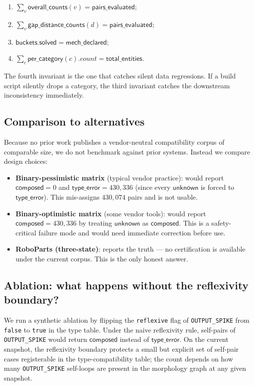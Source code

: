 \documentclass[11pt,twocolumn]{article}
\begin{document}
\begin{enumerate}[nosep]
\item $\sum_{v} \mathsf{overall\_counts}(v) = \mathsf{pairs\_evaluated}$;
\item $\sum_{v} \mathsf{gap\_distance\_counts}(d) = \mathsf{pairs\_evaluated}$;
\item $\mathsf{buckets.solved} = \mathsf{mech\_declared}$;
\item $\sum_{c} \mathsf{per\_category}(c).count = \mathsf{total\_entities}$.
\end{enumerate}

The fourth invariant is the one that catches silent data regressions.
If a build script silently drops a category, the third invariant
catches the downstream inconsistency immediately.

\subsection{Comparison to alternatives}

Because no prior work publishes a vendor-neutral compatibility corpus
of comparable size, we do not benchmark against prior systems.
Instead we compare design choices:

\begin{itemize}[nosep,leftmargin=*]
\item \textbf{Binary-pessimistic matrix} (typical vendor practice):
would report $\mathsf{composed} = 0$ and $\mathsf{type\_error}
= 430{,}336$ (since every $\mathsf{unknown}$ is forced to
$\mathsf{type\_error}$). This mis-assigns $430{,}074$ pairs and is
not usable.

\item \textbf{Binary-optimistic matrix} (some vendor tools):
would report $\mathsf{composed} = 430{,}336$ by treating
$\mathsf{unknown}$ as $\mathsf{composed}$. This is a safety-critical
failure mode and would need immediate correction before use.

\item \textbf{RoboParts (three-state)}: reports the truth — no
certification is available under the current corpus. This is the
only honest answer.
\end{itemize}

\subsection{Ablation: what happens without the reflexivity boundary?}

We run a synthetic ablation by flipping the \texttt{reflexive} flag
of \texttt{OUTPUT\_SPIKE} from \texttt{false} to \texttt{true} in
the type table. Under the naive reflexivity rule, self-pairs of
\texttt{OUTPUT\_SPIKE} would return $\mathsf{composed}$ instead of
$\mathsf{type\_error}$. On the current snapshot, the reflexivity
boundary protects a small but explicit set of self-pair cases
registerable in the type-compatibility table; the count depends on
how many \texttt{OUTPUT\_SPIKE} self-loops are present in the
morphology graph at any given snapshot.
\end{document}
